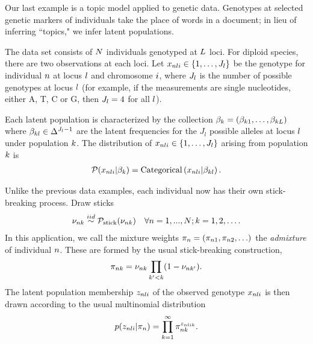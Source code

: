 
Our last example is a topic model applied to genetic data.
Genotypes at selected genetic markers of individuals take the place of
words in a document; in lieu of inferring ``topics," we infer latent populations.

\begin{ex}

The data set consists of $N$ individuals genotyped at $L$ loci.
For diploid species, there are two observations at each loci.
Let $x_{nli}\in\{1, \ldots, J_l\}$ be the genotype for individual $n$ at locus $l$ and chromosome $i$,
where $J_l$ is the number of possible genotypes at locus $l$
(for example, if the measurements are single nucleotides, either A, T, C or G,
then $J_l = 4$ for all $l$).

Each latent population is characterized by the collection
$\beta_k = (\beta_{k1}, \ldots, \beta_{kL})$ where
$\beta_{kl}\in\Delta^{J_l - 1}$ are the latent frequencies for the $J_l$
possible alleles at locus $l$ under population $k$.
The distribution of $x_{nli}\in\{1, \ldots, J_l\}$ arising from population $k$ is
\begin{align*}
\mathcal{P}(x_{nli} \vert \beta_{k}) =
\mathrm{Categorical}\left(x_{nli}\vert \beta_{kl}\right).
\end{align*}


Unlike the previous data examples, each individual now has their own stick-breaking process. Draw sticks
\begin{align*}
\nu_{nk} \overset{iid}{\sim} \mathcal{P}_{\mathrm{stick}}(\nu_{nk}) \quad \forall n = 1, ..., N; k = 1, 2, \ldots.
\end{align*}
In this application,
we call the mixture weights
$\pi_{n} = (\pi_{n1}, \pi_{n2}, \ldots)$ the
\textit{admixture} of individual $n$.
These are formed by the usual stick-breaking construction,
\begin{align*}
\pi_{nk} = \nu_{nk} \prod_{k' < k} (1 - \nu_{nk'}).
\end{align*}
%
The latent population membership $z_{nli}$ of the observed genotype
$x_{nli}$ is then drawn according to the usual multinomial distribution
\begin{align*}
p(z_{nli} | \pi_n) = \prod_{k=1}^{\infty} \pi_{nk}^{z_{nlik}}.
\end{align*}


\end{ex}
